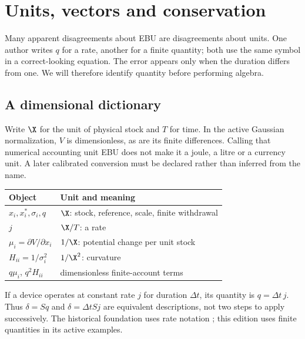\chapter{Units, vectors and conservation}\label{ch:units}
Many apparent disagreements about EBU are disagreements about units. One
author writes $q$ for a rate, another for a finite quantity; both use the
same symbol in a correct-looking equation. The error appears only when the
duration differs from one. We will therefore identify quantity before
performing algebra.

\section{A dimensional dictionary}
Write $\X$ for the unit of physical stock and $T$ for time. In the active
Gaussian normalization, $V$ is dimensionless, as are its finite differences.
Calling that numerical accounting unit EBU does not make it a joule, a litre
or a currency unit. A later calibrated conversion must be declared rather
than inferred from the name.

\begin{center}
\begin{tabular}{P{.39\linewidth}P{.48\linewidth}}
\toprule Object & Unit and meaning\\\midrule
$x_i,x_i^*,\sigma_i,q$ & $\X$: stock, reference, scale, finite withdrawal\\
$j$ & $\X/T$: a rate\\
$\mu_i=\partial V/\partial x_i$ & $1/\X$: potential change per unit stock\\
$H_{ii}=1/\sigma_i^2$ & $1/\X^2$: curvature\\
$q\mu_i$, $q^2H_{ii}$ & dimensionless finite-account terms\\
\bottomrule
\end{tabular}
\end{center}

If a device operates at constant rate $j$ for duration $\Delta t$, its
quantity is $q=\Delta t\,j$. Thus $\delta=S q$ and
$\delta=\Delta t S j$ are equivalent descriptions, not two steps to apply
successively. The historical foundation uses rate notation
\cite{foundation}; this edition uses finite quantities in its active examples.

